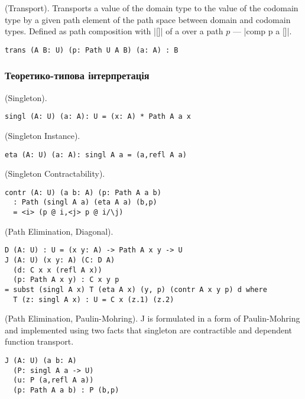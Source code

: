 \begin{theorem} (Transport).
Transports a value of the domain type to the value of the codomain type
by a given path element of the path space between domain and codomain types.
Defined as path composition with |[]| of a over a path $p$ --- |comp p a []|.
\begin{lstlisting}
trans (A B: U) (p: Path U A B) (a: A) : B
\end{lstlisting}
\end{theorem}

\subsubsection{Теоретико-типова інтерпретація}

\begin{definition} (Singleton).
\begin{lstlisting}
singl (A: U) (a: A): U = (x: A) * Path A a x
\end{lstlisting}
\end{definition}

\begin{theorem} (Singleton Instance).
\begin{lstlisting}
eta (A: U) (a: A): singl A a = (a,refl A a)
\end{lstlisting}
\end{theorem}

\begin{theorem} (Singleton Contractability).
\begin{lstlisting}
contr (A: U) (a b: A) (p: Path A a b)
  : Path (singl A a) (eta A a) (b,p)
  = <i> (p @ i,<j> p @ i/\j)
\end{lstlisting}
\end{theorem}

\begin{theorem} (Path Elimination, Diagonal).
\begin{lstlisting}
D (A: U) : U = (x y: A) -> Path A x y -> U
J (A: U) (x y: A) (C: D A)
  (d: C x x (refl A x))
  (p: Path A x y) : C x y p
= subst (singl A x) T (eta A x) (y, p) (contr A x y p) d where
  T (z: singl A x) : U = C x (z.1) (z.2)
\end{lstlisting}
\end{theorem}

\begin{theorem} (Path Elimination, Paulin-Mohring).
J is formulated in a form of Paulin-Mohring and implemented using
two facts that singleton are contractible and dependent function
transport.
\begin{lstlisting}
J (A: U) (a b: A)
  (P: singl A a -> U)
  (u: P (a,refl A a))
  (p: Path A a b) : P (b,p)
\end{lstlisting}
\end{theorem}

